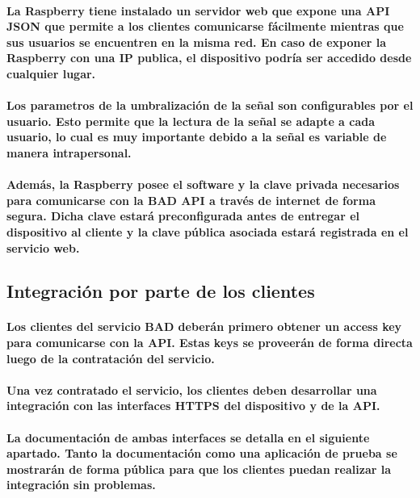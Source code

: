 \documentclass{article}
\begin{document}
\paragraph{
La Raspberry tiene instalado un servidor web que expone una API JSON que permite a los clientes comunicarse fácilmente mientras que sus usuarios se encuentren en la misma red. En caso de exponer la Raspberry con una IP publica, el dispositivo podría ser accedido desde cualquier lugar.
}
\paragraph{
Los parametros de la umbralización de la señal son configurables por el usuario. Esto permite que la lectura de la señal se adapte a cada usuario, lo cual es muy importante debido a la señal es variable de manera intrapersonal.
}
\paragraph{
Además, la Raspberry posee el software y la clave privada necesarios para comunicarse con la BAD API a través de internet de forma segura. Dicha clave estará preconfigurada antes de entregar el dispositivo al cliente y la clave pública asociada estará registrada en el servicio web.
}

\subsection{Integración por parte de los clientes}
\paragraph{
Los clientes del servicio BAD deberán primero obtener un access key para comunicarse con la API. Estas keys se proveerán de forma directa luego de la contratación del servicio.
}
\paragraph{
Una vez contratado el servicio, los clientes deben desarrollar una integración con las interfaces HTTPS del dispositivo y de la API.
}
\paragraph{
La documentación de ambas interfaces se detalla en el siguiente apartado. Tanto la documentación como una aplicación de prueba se mostrarán de forma pública para que los clientes puedan realizar la integración sin problemas.
}
\end{document}
